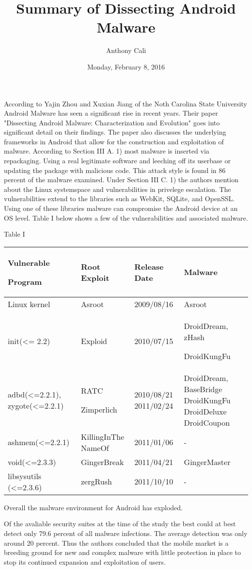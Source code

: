 \documentclass{article}
\title{Summary of Dissecting Android Malware}
\author{Anthony Cali}
\date{Monday, February 8, 2016}
\begin{document}
    \maketitle
    According to Yajin Zhou and Xuxian Jiang of the Noth Carolina State University Android Malware has seen a significant rise in recent years.  Their paper "Dissecting Android Malware: Characterization and Evolution" goes into significant detail on their findings.  The paper also discusses the underlying frameworks in Android that allow for the construction and exploitation of malware.  \indent According to Section III A. 1) most malware is inserted via repackaging.  Using a real legitimate software and leeching off its userbase or updating the package with malicious code.  This attack style is found in 86 percent of the malware examined.  Under Section III C. 1) the authors mention about the Linux systemspace and vulnerabilities in privelege escalation.  The vulnerabilities extend to the libraries such as WebKit, SQLite, and OpenSSL.  Using one of these libraries malware can compromise the Android device at an OS level. Table I below shows a few of the vulnerabilities and associated malware.
    \begin{center} Table I
      \begin{tabularx}{\textwidth}{ |X|X|X|X| }
        \hline
        Vulnerable \par Program & Root Exploit & Release Date & Malware\\
        \hline
        Linux kernel & Asroot & 2009/08/16 & Asroot \\
        \hline
        init(\textless= 2.2) & Exploid & 2010/07/15 & DroidDream, zHash \par DroidKungFu\\
        \hline
        adbd(\textless=2.2.1), zygote(\textless=2.2.1) & RATC \par Zimperlich & 2010/08/21 2011/02/24 & DroidDream, BaseBridge DroidKungFu DroidDeluxe DroidCoupon\\
        \hline
        ashmem(\textless=2.2.1) & KillingInThe NameOf & 2011/01/06 & -\\
        \hline
        void(\textless=2.3.3) & GingerBreak & 2011/04/21 & GingerMaster\\
        \hline
        libsysutils (\textless=2.3.6) & zergRush & 2011/10/10 & -\\
        \hline
      \end{tabularx}
  \end{center}
Overall the malware environment for Android has exploded.\par
\indent Of the avaliable security suites at the time of the study the best could at best detect only 79.6 percent of all malware infections.  The average detection was only around 20 percent.  Thus the authors concluded that the mobile market is a breeding ground for new and complex malware with little protection in place to stop its continued expansion and exploitation of users.
\end{document}
